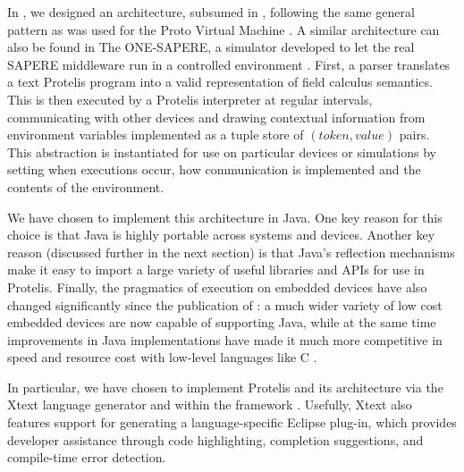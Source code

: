 \documentclass[12pt,a4paper,twoside,openright]{book}
\begin{document}
In \protelis{}, we designed an architecture, subsumed in , following the same general pattern as was used for the Proto Virtual Machine \cite{protokernel}.
%
A similar architecture can also be found in The ONE-SAPERE, a simulator developed to let the real SAPERE middleware run in a controlled environment \cite{Fernandez-MarquezASSC14}.
%
First, a parser translates a text Protelis program into a valid representation of field calculus semantics.
%
This is then executed by a Protelis interpreter at regular intervals, communicating with other devices and drawing contextual information from environment variables implemented as a tuple store of $(token, value)$ pairs.
%
This abstraction is instantiated for use on particular devices or simulations by setting when executions occur, how communication is implemented and the contents of the environment.

We have chosen to implement this architecture in Java.
%
One key reason for this choice is that Java is highly portable across systems and devices.
%
Another key reason (discussed further in the next section) is that Java's reflection mechanisms make it easy to import a large variety of useful libraries and APIs for use in Protelis.
%
Finally, the pragmatics of execution on embedded devices have also changed significantly since the publication of \cite{protokernel}: a much wider variety of low cost embedded devices are now capable of supporting Java, while at the same time improvements in Java implementations have made it much more competitive in speed and resource cost with low-level languages like C \cite{bull2003, oancea2011}.

In particular, we have chosen to implement Protelis and its architecture via the Xtext language generator \cite{eysholdt2010xtext} and within the \alchemist{} framework \cite{alchemist-jos2013}.
%
Usefully, Xtext also features support for generating a language-specific Eclipse plug-in, which provides developer assistance through code highlighting, completion suggestions, and compile-time error detection.
\end{document}
